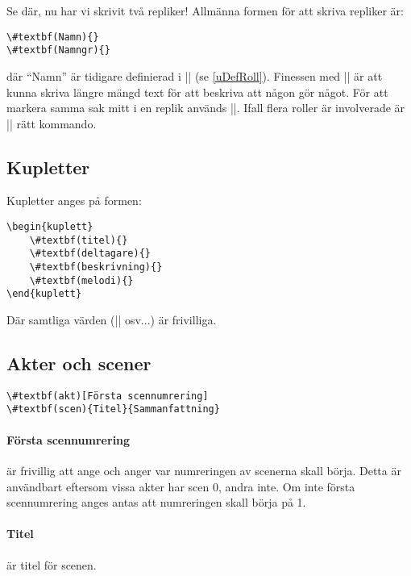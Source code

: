 \documentclass{article}
\newcommand{\citat}[1]{``#1''}
\begin{document}
Se där, nu har vi skrivit två repliker! Allmänna formen för att skriva repliker är:
\begin{Verbatim}[commentchar=!, commandchars=\#\(\),numberblanklines=false]
\#textbf(Namn){} 
\#textbf(Namngr){} 
\end{Verbatim}

där \citat{Namn} är tidigare definierad i |\nyroll| (se \ref{uDefRoll}). Finessen med |\Namngr| är att kunna skriva längre mängd text för att beskriva att någon gör något. För att markera samma sak mitt i en replik används |\gr|. Ifall flera roller är involverade är |\allgr{}| rätt kommando.


\subsection{Kupletter}
Kupletter anges på formen:
\begin{Verbatim}[commentchar=!, commandchars=\#\(\),numberblanklines=false]
\begin{kuplett}
	\#textbf(titel){}
	\#textbf(deltagare){}
	\#textbf(beskrivning){}
	\#textbf(melodi){}
\end{kuplett} 
\end{Verbatim}

Där samtliga värden (|\titel| osv...) är frivilliga. 


\subsection{Akter och scener}
\begin{Verbatim}[commentchar=!, commandchars=\#\(\),numberblanklines=false]
\#textbf(akt)[Första scennumrering] 
\#textbf(scen){Titel}{Sammanfattning}
\end{Verbatim}

\paragraph{Första scennumrering} är frivillig att ange och anger var numreringen av scenerna skall börja. Detta är användbart eftersom vissa akter har scen 0, andra inte. Om inte första scennumrering anges antas att numreringen skall börja på 1.

\paragraph{Titel} är titel för scenen.
\end{document}
